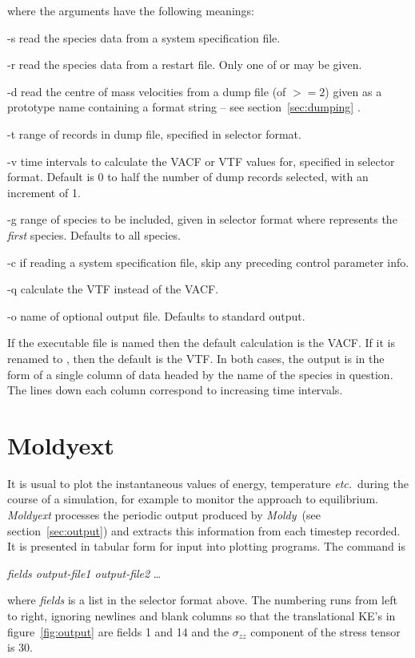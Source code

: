 \documentclass[a4paper,twoside]{report}
\newcommand{\moldy}{\emph{Moldy}}
\newcommand{\etc}{\emph{etc.}}
\begin{document}
where the arguments have the following meanings:
\begin{Argdescription}
\item[-s] read the species data from a system specification file.
\item[-r] read the species data from a restart file. Only one of  
or  may be given.
\item[-d] read the centre of mass velocities from a dump file (of  
$>= 2$) given as a prototype name containing a  format 
string -- see section~\ref{sec:dumping} .
\item[-t] range of records in dump file, specified in selector format.
\item[-v] time intervals to calculate the VACF or VTF values for, specified 
in selector format. Default is 0 to half the number of dump 
records selected, with an increment of 1.
\item[-g] range of species to be included, given in selector format 
where  represents the \emph{first} species. Defaults to all species.
\item[-c] if reading a system specification file, skip any preceding control 
parameter info.
\item[-q] calculate the VTF instead of the VACF.
\item[-o] name of optional output file. Defaults to standard output.
\end{Argdescription}

If the executable file is named  then the default calculation 
is the VACF. If it is renamed to , then the default is the 
VTF. In both cases, the output is in the form of a single column 
of data headed by the name of the species in question. The lines 
down each column correspond to increasing time intervals.

\section{Moldyext}%
It is usual to plot the instantaneous values of energy, temperature
\etc\ during the course of a simulation, for example to monitor the
approach to equilibrium.  \emph{Moldyext} processes the periodic
output produced by \moldy\ (see section~\ref{sec:output}) and extracts
this information from each timestep recorded.  It is presented in
tabular form for input into plotting programs.  The command is
\begin{center}
 \textit{fields output-file1 output-file2} \ldots
\end{center}
where \emph{fields} is a list in the selector format above.  The
numbering runs from left to right, ignoring newlines and blank columns
so that the translational KE's in figure~\ref{fig:output} are fields 1
and 14 and the $\sigma_{zz}$ component of the stress tensor is 30.
\end{document}
